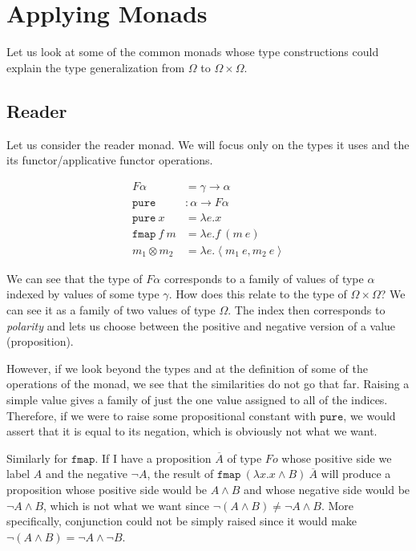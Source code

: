 \documentclass[a4paper,11pt,DIV=12]{scrartcl}
\begin{document}
\section{Applying Monads}

Let us look at some of the common monads whose type constructions could
explain the type generalization from $\Omega$ to $\Omega \times \Omega$.

\subsection{Reader}
\label{ssec:reader}

Let us consider the reader monad. We will focus only on the types it
uses and the its functor/applicative functor operations.

\begin{align*}
  F \alpha &= \gamma \to \alpha \\
  \texttt{pure} &: \alpha \to F \alpha \\
  \texttt{pure}\ x &= \lambda e. x \\
  \texttt{fmap}\ f\ m &= \lambda e. f\ (m\ e) \\
  m_1 \otimes m_2 &= \lambda e. \left<m_1\ e, m_2\ e\right>
\end{align*}

We can see that the type of $F \alpha$ corresponds to a family of values of
type $\alpha$ indexed by values of some type $\gamma$. How does this relate
to the type of $\Omega \times \Omega$? We can see it as a family of two
values of type $\Omega$. The index then corresponds to \emph{polarity} and
lets us choose between the positive and negative version of a value
(proposition).

However, if we look beyond the types and at the definition of some of the
operations of the monad, we see that the similarities do not go that
far. Raising a simple value gives a family of just the one value assigned
to all of the indices. Therefore, if we were to raise some propositional
constant with $\texttt{pure}$, we would assert that it is equal to its
negation, which is obviously not what we want.

Similarly for $\texttt{fmap}$. If I have a proposition $\overline{A}$ of
type $F o$ whose positive side we label $A$ and the negative $\lnot A$, the
result of $\texttt{fmap}\ (\lambda x. x \land B)\ \overline{A}$ will
produce a proposition whose positive side would be $A \land B$ and whose
negative side would be $\lnot A \land B$, which is not what we want since
$\lnot(A \land B) \neq \lnot A \land B$. More specifically, conjunction
could not be simply raised since it would make $\lnot (A \land B) = \lnot A
\land \lnot B$.
\end{document}
